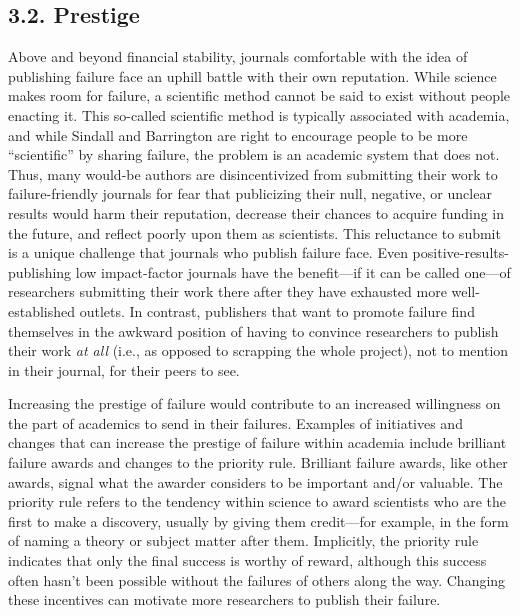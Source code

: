 \documentclass{article}
\begin{document}
\subsection{3.2. Prestige }

Above and beyond financial stability, journals comfortable with the idea of publishing failure face an uphill battle with their own reputation. While science makes room for failure, a scientific method cannot be said to exist without people enacting it. This so-called scientific method is typically associated with academia, and while Sindall and Barrington are right to encourage people to be more “scientific” by sharing failure, the problem is an academic system that does not. Thus, many would-be authors are disincentivized from submitting their work to failure-friendly journals for fear that publicizing their null, negative, or unclear results would harm their reputation, decrease their chances to acquire funding in the future, and reflect poorly upon them as scientists. This reluctance to submit is a unique challenge that journals who publish failure face. Even positive-results-publishing low impact-factor journals have the benefit—if it can be called one—of researchers submitting their work there after they have exhausted more well-established outlets. In contrast, publishers that want to promote failure find themselves in the awkward position of having to convince researchers to publish their work \emph{at all} (i.e., as opposed to scrapping the whole project), not to mention in their journal, for their peers to see. 

Increasing the prestige of failure would contribute to an increased willingness on the part of academics to send in their failures. Examples of initiatives and changes that can increase the prestige of failure within academia include brilliant failure awards and changes to the priority rule. Brilliant failure awards, like other awards, signal what the awarder considers to be important and/or valuable. The priority rule refers to the tendency within science to award scientists who are the first to make a discovery, usually by giving them credit—for example, in the form of naming a theory or subject matter after them. Implicitly, the priority rule indicates that only the final success is worthy of reward, although this success often hasn't been possible without the failures of others along the way. Changing these incentives can motivate more researchers to publish their failure. 
\end{document}

